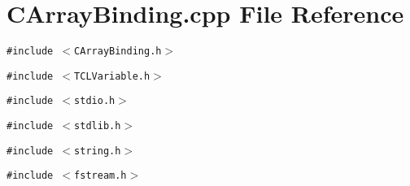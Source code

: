 \section{CArray\-Binding.cpp File Reference}
\label{CArrayBinding_8cpp}
{\tt \#include $<$CArray\-Binding.h$>$}\par
{\tt \#include $<$TCLVariable.h$>$}\par
{\tt \#include $<$stdio.h$>$}\par
{\tt \#include $<$stdlib.h$>$}\par
{\tt \#include $<$string.h$>$}\par
{\tt \#include $<$fstream.h$>$}\par
